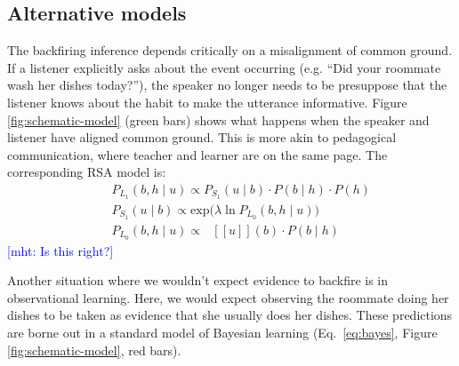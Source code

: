 \documentclass[10pt,letterpaper]{article}
\newcommand{\denote}[1]{\mbox{ $[\![ #1 ]\!]$}}
\newcommand{\mht}[1]{\textcolor{Blue}{[mht: #1]}}
\begin{document}
\subsection{Alternative models}

The backfiring inference depends critically on a misalignment of common ground. 
If a listener explicitly asks about the event occurring (e.g. ``Did your roommate wash her dishes today?''), the speaker no longer needs to be presuppose that the listener knows about the habit to make the utterance informative. 
Figure \ref{fig:schematic-model} (green bars) shows what happens when the speaker and listener have aligned common ground.
This is more akin to pedagogical communication, where teacher and learner are on the same page. 
The corresponding RSA model is:
\begin{eqnarray}
&&P_{L_1}(b, h \mid u)\propto P_{S_1}(u \mid b)\cdot P(b \mid h) \cdot P(h) \label{eq:L1mod}\\
&&P_{S_1}(u \mid b) \propto \mathrm{exp}({\lambda \ln P_{L_0}(b, h \mid u))} \label{eq:S1mod}\\
&&P_{L_0}(b, h \mid u)\propto \denote{u}(b) \cdot P(b \mid h) \label{eq:L0mod}
\end{eqnarray}
\mht{Is this right?}

Another situation where we wouldn't expect evidence to backfire is in observational learning.
Here, we would expect observing the roommate doing her dishes to be taken as evidence that she usually does her dishes. 
These predictions are borne out in a standard model of Bayesian learning (Eq.~\ref{eq:bayes}, Figure \ref{fig:schematic-model}, red bars).




\end{document}
